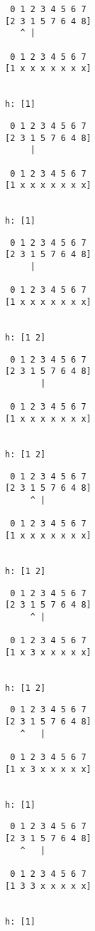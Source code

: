 { \begin{verbatim}
 0 1 2 3 4 5 6 7
[2 3 1 5 7 6 4 8]
   ^ |

 0 1 2 3 4 5 6 7
[1 x x x x x x x]


h: [1]
\end{verbatim} }

{ \begin{verbatim}
 0 1 2 3 4 5 6 7
[2 3 1 5 7 6 4 8]
     |

 0 1 2 3 4 5 6 7
[1 x x x x x x x]


h: [1]
\end{verbatim} }

{ \begin{verbatim}
 0 1 2 3 4 5 6 7
[2 3 1 5 7 6 4 8]
     |

 0 1 2 3 4 5 6 7
[1 x x x x x x x]


h: [1 2]
\end{verbatim} }

{ \begin{verbatim}
 0 1 2 3 4 5 6 7
[2 3 1 5 7 6 4 8]
       |

 0 1 2 3 4 5 6 7
[1 x x x x x x x]


h: [1 2]
\end{verbatim} }

{ \begin{verbatim}
 0 1 2 3 4 5 6 7
[2 3 1 5 7 6 4 8]
     ^ |

 0 1 2 3 4 5 6 7
[1 x x x x x x x]


h: [1 2]
\end{verbatim} }

{ \begin{verbatim}
 0 1 2 3 4 5 6 7
[2 3 1 5 7 6 4 8]
     ^ |

 0 1 2 3 4 5 6 7
[1 x 3 x x x x x]


h: [1 2]
\end{verbatim} }

{ \begin{verbatim}
 0 1 2 3 4 5 6 7
[2 3 1 5 7 6 4 8]
   ^   |

 0 1 2 3 4 5 6 7
[1 x 3 x x x x x]


h: [1]
\end{verbatim} }

{ \begin{verbatim}
 0 1 2 3 4 5 6 7
[2 3 1 5 7 6 4 8]
   ^   |

 0 1 2 3 4 5 6 7
[1 3 3 x x x x x]


h: [1]
\end{verbatim} }

